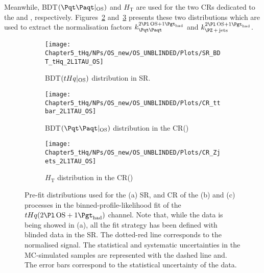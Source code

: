 Meanwhile, BDT$(\ttbar|_{\text{OS}})$ and $H_{\text{T}}$ are used for the two CRs dedicated to the \ttbar and \Zjets, respectively.
Figures~\ref{fig:ChaptH:PreFit:OS:CR_tt} and~\ref{fig:ChaptH:PreFit:OS:CR_zjets} presents these two distributions which are used to extract the normalisation factors $k_{\ttbar}^{\dilepOStau}$
and $k_{\Zjets}^{\dilepOStau}$.




\begin{figure}[h]
\centering
\begin{subfigure}{.5\textwidth}
  \centering
  \texttt{[image: Chapter5\_tHq/NPs/OS\_new/OS\_UNBLINDED/Plots/SR\_BDT\_tHq\_2L1TAU\_OS]}
  \caption{BDT$(tHq|_{\text{OS}})$ distribution in SR.}
  \label{fig:ChaptH:PreFit:OS:SR}
\end{subfigure}%
\hfill
\begin{subfigure}{.5\textwidth}
  \centering
  \texttt{[image: Chapter5\_tHq/NPs/OS\_new/OS\_UNBLINDED/Plots/CR\_ttbar\_2L1TAU\_OS]}
  \caption{BDT$(\ttbar|_{\text{OS}})$ distribution in the CR(\ttbar)}
  \label{fig:ChaptH:PreFit:OS:CR_tt}
\end{subfigure}%
\hfill
\begin{subfigure}{.5\textwidth}
  \centering
  \texttt{[image: Chapter5\_tHq/NPs/OS\_new/OS\_UNBLINDED/Plots/CR\_Zjets\_2L1TAU\_OS]}
  \caption{$H_{\text{T}}$ distribution in the CR(\Zjets)}
  \label{fig:ChaptH:PreFit:OS:CR_zjets}
\end{subfigure}%
\caption{Pre-fit distributions used for the (a) \tHq SR, and CR of the (b) \ttbar and (c) \Zjets processes in the
binned-profile-likelihood fit of the $\tHq(\dilepOStau)$ channel.
Note that, while the data is being showed in (a), all the fit strategy has been defined with blinded data in the SR.
The dotted-red line corresponds to the normalised \tHq signal.
The statistical and systematic uncertainties in the MC-simulated samples are represented with the dashed line
and. The error bars correspond to the statistical uncertainty of the data.}
\label{fig:ChaptH:PreFit:OS:SR_CRs}
\end{figure}


